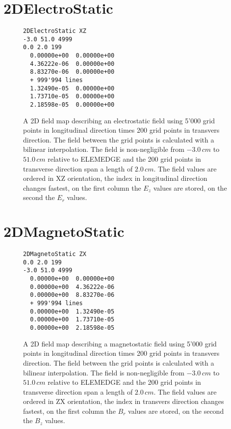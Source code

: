 \section{2DElectroStatic}
\label{sec:2DElectroStatic}
\begin{figure}[h]
\label{fig:2DElectroStatic}
\begin{fmpage}
\begin{verbatim}
2DElectroStatic XZ
-3.0 51.0 4999
0.0 2.0 199
  0.00000e+00  0.00000e+00
  4.36222e-06  0.00000e+00
  8.83270e-06  0.00000e+00
  + 999'994 lines
  1.32490e-05  0.00000e+00
  1.73710e-05  0.00000e+00
  2.18598e-05  0.00000e+00
\end{verbatim}
\end{fmpage}
\caption[Example of a 2DElectroStatic field map]{A 2D field map describing an electrostatic field using 5'000 grid points in longitudinal direction times 200 grid points in transvers direction. The field between the grid points is calculated with a bilinear interpolation. The field is non-negligible from $-3.0\,cm$ to $51.0\,cm$ relative to ELEMEDGE and the 200 grid points in transverse direction span a length of $2.0\,cm$. The field values are ordered in XZ orientation, the index in longitudinal direction changes fastest, on the first column the $E_z$ values are stored, on the second the $E_r$ values.}
\end{figure}
\clearpage

\section{2DMagnetoStatic}
\label{sec:2DMagnetoStatic}
\begin{figure}[h]
\label{fig:2DMagnetoStatic}
\begin{fmpage}
\begin{verbatim}
2DMagnetoStatic ZX
0.0 2.0 199
-3.0 51.0 4999
  0.00000e+00  0.00000e+00
  0.00000e+00  4.36222e-06
  0.00000e+00  8.83270e-06
  + 999'994 lines
  0.00000e+00  1.32490e-05
  0.00000e+00  1.73710e-05
  0.00000e+00  2.18598e-05
\end{verbatim}
\end{fmpage}
\caption[Example of a 2DMagnetoStatic field map]{A 2D field map describing a magnetostatic field using 5'000 grid points in longitudinal direction times 200 grid points in transvers direction. The field between the grid points is calculated with a bilinear interpolation. The field is non-negligible from $-3.0\,cm$ to $51.0\,cm$ relative to ELEMEDGE and the 200 grid points in transverse direction span a length of $2.0\,cm$. The field values are ordered in ZX orientation, the index in transvers direction changes fastest, on the first column the $B_r$ values are stored, on the second the $B_z$ values.}
\end{figure}
\clearpage

